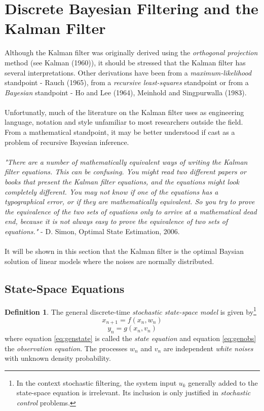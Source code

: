 \documentclass{article}
\theoremstyle{definition}
\newtheorem{definition}[thm]{Definition}
\theoremstyle{remark}
\begin{document}
\newpage
\section{Discrete Bayesian Filtering and the Kalman Filter}\label{sec:kalmanFilter}

Although the Kalman filter was originally derived using the \emph{orthogonal projection} method (see Kalman (1960)), it should be stressed that the Kalman filter has several interpretations. Other derivations have been from a \emph{maximum-likelihood} standpoint - Rauch (1965), from a \emph{recursive least-squares} standpoint or from a \emph{Bayesian} standpoint - Ho and Lee (1964),  Meinhold and Singpurwalla (1983). \\
\\
Unfortunatly, much of the literature on the Kalman filter uses as engineering language, notation and style unfamiliar to most researchers outside the field. From a mathematical standpoint, it may be better understood if cast as a problem of recursive Bayesian inference.
\\
\\
\textit{"There are a number of mathematically equivalent ways of writing the Kalman filter equations. This can be confusing. You might read two different papers or books that present the Kalman filter equations, and the equations might look completely different. You may not know if one of the equations has a typographical error, or if they are mathematically equivalent. So you try to prove the equivalence of the two sets of equations only to arrive at a mathematical dead end, because it is not  always easy to prove the equivalence of two sets of equations."} - D. Simon, Optimal State Estimation, 2006.
\\
\\
It will be shown in this section that the Kalman filter is the optimal Baysian solution of linear models where the noises are normally distributed.\\







\subsection{State-Space Equations}
\begin{definition}
The general discrete-time \emph{stochastic state-space model} is given by\footnote{In the context stochastic filtering, the system input $u_k$ generally added to the state-space equation is irrelevant. Its inclusion is only justified in \emph{stochastic control} problems.}
\begin{equation}\label{eq:genstate}
x_{n+1}=f(x_n, w_n)
\end{equation}
\begin{equation}\label{eq:genobs}
y_{n}=g(x_n, v_n)
\end{equation}
where equation \eqref{eq:genstate} is called the \emph{state equation} and equation \eqref{eq:genobs} the \emph{observation equation}. The processes $w_n$ and $v_n$ are independent \emph{white noises} with unknown density probability. 
\end{definition}
\end{document}
